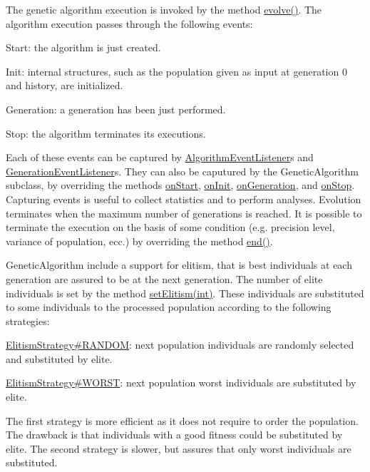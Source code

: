 The genetic algorithm execution is invoked by the method \hyperlink{classjenes_1_1_genetic_algorithm_3_01_t_01extends_01_chromosome_01_4_a8afdd855dc891b981cbf675c63db72c3}{evolve()}. The algorithm execution passes through the following events\-: 
\begin{DoxyItemize}
\item Start\-: the algorithm is just created. 
\item Init\-: internal structures, such as the population given as input at generation 0 and history, are initialized. 
\item Generation\-: a generation has been just performed. 
\item Stop\-: the algorithm terminates its executions. 
\end{DoxyItemize}Each of these events can be captured by \hyperlink{}{Algorithm\-Event\-Listener}s and \hyperlink{}{Generation\-Event\-Listener}s. They can also be caputured by the {\ttfamily Genetic\-Algorithm} subclass, by overriding the methods \hyperlink{classjenes_1_1_genetic_algorithm_3_01_t_01extends_01_chromosome_01_4_a0ed4a97cf7e3266913eaad8092913de3}{on\-Start}, \hyperlink{classjenes_1_1_genetic_algorithm_3_01_t_01extends_01_chromosome_01_4_a85479397ce0f8bd995b97fa91f4d6690}{on\-Init}, \hyperlink{classjenes_1_1_genetic_algorithm_3_01_t_01extends_01_chromosome_01_4_aed0d630f1e0b290bb87ba9ab8b164b89}{on\-Generation}, and \hyperlink{classjenes_1_1_genetic_algorithm_3_01_t_01extends_01_chromosome_01_4_a04258af6f64ec98561b015651d20f9ea}{on\-Stop}. Capturing events is useful to collect statistics and to perform analyses. Evolution terminates when the maximum number of generations is reached. It is possible to terminate the execution on the basis of some condition (e.\-g. precision level, variance of population, ecc.) by overriding the method \hyperlink{classjenes_1_1_genetic_algorithm_3_01_t_01extends_01_chromosome_01_4_a41376d72c82d4503693eebb3832cf772}{end()}. 

{\ttfamily Genetic\-Algorithm} include a support for elitism, that is best individuals at each generation are assured to be at the next generation. The number of elite individuals is set by the method \hyperlink{}{set\-Elitism(int)}. These individuals are substituted to some individuals to the processed population according to the following strategies\-: 
\begin{DoxyItemize}
\item \hyperlink{}{Elitism\-Strategy\#\-R\-A\-N\-D\-O\-M}\-: next population individuals are randomly selected and substituted by elite. 
\item \hyperlink{}{Elitism\-Strategy\#\-W\-O\-R\-S\-T}\-: next population worst individuals are substituted by elite. 
\end{DoxyItemize}The first strategy is more efficient as it does not require to order the population. The drawback is that individuals with a good fitness could be substituted by elite. The second strategy is slower, but assures that only worst individuals are substituted. 

